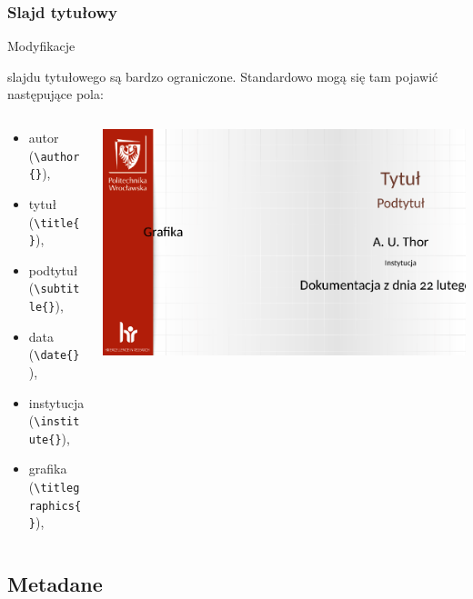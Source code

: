 \documentclass[12pt,aspectratio=169,ignorenonframetext]{beamer}
\begin{document}
\begin{frame}[fragile]
 \frametitle<presentation>{Slajd tytułowy}
 \hypertarget{tytul}{Modyfikacje} slajdu tytułowego są bardzo ograniczone. Standardowo mogą się tam pojawić następujące pola:
 \begin{columns}
  \begin{column}{.5\textwidth}
   \begin{itemize}
    \item
          autor (\lstinline|\author{}|),
    \item
          tytuł (\lstinline|\title{}|),
    \item
          podtytuł (\lstinline|\subtitle{}|),
    \item
          data (\lstinline|\date{}|),
    \item
          instytucja (\lstinline|\institute{}|),
    \item
          grafika (\lstinline|\titlegraphics{}|),
   \end{itemize}
  \end{column}
  \begin{column}{.48\textwidth}
     \includegraphics[width=.6\textwidth]{metadane}

  \end{column}
 \end{columns}
\end{frame}



\subsection{Metadane}
\end{document}
